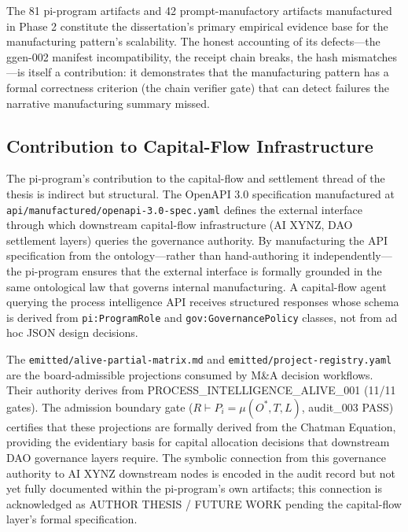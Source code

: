 The 81 pi-program artifacts and 42 prompt-manufactory artifacts manufactured in Phase 2 constitute the dissertation's primary empirical evidence base for the manufacturing pattern's scalability. The honest accounting of its defects---the ggen-002 manifest incompatibility, the receipt chain breaks, the hash mismatches---is itself a contribution: it demonstrates that the manufacturing pattern has a formal correctness criterion (the chain verifier gate) that can detect failures the narrative manufacturing summary missed.

\subsection{Contribution to Capital-Flow Infrastructure}
\label{sec:research-pi-program-contribution-capital-flow}

The pi-program's contribution to the capital-flow and settlement thread of the thesis is indirect but structural. The OpenAPI 3.0 specification manufactured at \texttt{api/manufactured/openapi-3.0-spec.yaml} defines the external interface through which downstream capital-flow infrastructure (AI XYNZ, DAO settlement layers) queries the governance authority. By manufacturing the API specification from the ontology---rather than hand-authoring it independently---the pi-program ensures that the external interface is formally grounded in the same ontological law that governs internal manufacturing. A capital-flow agent querying the process intelligence API receives structured responses whose schema is derived from \texttt{pi:ProgramRole} and \texttt{gov:GovernancePolicy} classes, not from ad hoc JSON design decisions.

The \texttt{emitted/alive-partial-matrix.md} and \texttt{emitted/project-registry.yaml} are the board-admissible projections consumed by M\&A decision workflows. Their authority derives from PROCESS\_INTELLIGENCE\_ALIVE\_001 (11/11 gates). The admission boundary gate ($R \vdash P_i = \mu(O^{*}, T, L)$, audit\_003 PASS) certifies that these projections are formally derived from the Chatman Equation, providing the evidentiary basis for capital allocation decisions that downstream DAO governance layers require. The symbolic connection from this governance authority to AI XYNZ downstream nodes is encoded in the audit record but not yet fully documented within the pi-program's own artifacts; this connection is acknowledged as AUTHOR THESIS / FUTURE WORK pending the capital-flow layer's formal specification.
